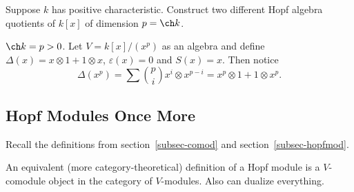 \documentclass[12pt]{article}
\begin{document}
\begin{prob}
	Suppose $k$ has positive characteristic. Construct two different Hopf algebra quotients of $k[x]$ of dimension $p=\ch k$.
\end{prob}

\begin{ex}
	$\ch k=p>0$. Let $V=k[x]/(x^p)$ as an algebra and define $\Delta(x)=x\otimes 1+1\otimes x$,
	$\varepsilon(x)=0$ and $S(x)=x$. Then notice
	\[\Delta(x^p)=\sum\binom{p}{i}x^i\otimes x^{p-i}=x^p\otimes 1+1\otimes x^p.\]
\end{ex}

\subsection{Hopf Modules Once More}
Recall the definitions from section~\ref{subsec-comod} and section~\ref{subsec-hopfmod}.

\begin{rmk}
	An equivalent (more category-theoretical) definition of a Hopf module is a $V$-comodule object in 
	the category of $V$-modules. Also can dualize everything.
\end{rmk}
\end{document}
